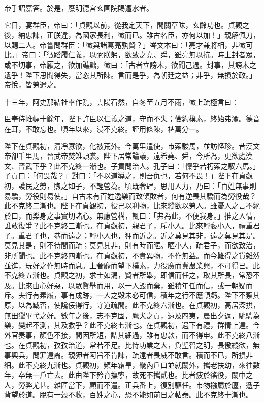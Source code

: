 \begin{pinyinscope}
 帝手詔嘉答。於是，廢明德宮玄圃院賜遭水者。



 它日，宴群臣，帝曰：「貞觀以前，從我定天下，間關草昧，玄齡功也。貞觀之後，納忠諫，正朕違，為國家長利，徵而已。雖古名臣，亦何以加！」親解佩刀，以賜二人。帝嘗問群臣：「徵與諸葛亮孰賢？」岑文本曰：「亮才兼將相，非徵可比。」帝曰：「徵蹈履仁義，以弼朕躬，欲致之堯、舜，雖亮無以抗。時上封者眾，或不切事，帝厭之，欲加譙黜，徵曰：「古者立謗木，欲聞己過。封事，其謗木之遺乎！陛下思聞得失，當恣其所陳。言而是乎，為朝廷之益；非乎，無損於政。」帝悅，皆勞遣之。



 十三年，阿史那結社率作亂，雲陽石然，自冬至五月不雨，徵上疏極言曰：



 臣奉侍帷幄十餘年，陛下許臣以仁義之道，守而不失；儉約樸素，終始弗渝。德音在耳，不敢忘也。頃年以來，浸不克終。謹用條陳，裨萬分一。



 陛下在貞觀初，清凈寡欲，化被荒外。今萬里遣使，市索駿馬，並訪怪珍。昔漢文帝卻千里馬，晉武帝焚雉頭裘。陛下居常論議，遠希堯、舜，今所為，更欲處漢文、晉武下乎？此不克終一漸也。子貢問治人。孔子曰：「懍乎若朽索之馭六馬。」子貢曰：「何畏哉？」對曰：「不以道導之，則吾仇也，若何不畏！」陛下在貞觀初，護民之勞，煦之如子，不輕營為。頃既奢肆，思用人力，乃曰：「百姓無事則易驕，勞役則易使。」自古未有百姓逸樂而致傾敗者，何有逆畏其驕而為勞役哉？此不克終二漸也。陛下在貞觀初，役己以利物，比來縱欲以勞人。雖憂人之言不絕於口，而樂身之事實切諸心。無慮營構，輒曰：「弗為此，不便我身。」推之人情，誰敢復爭？此不克終三漸也。在貞觀初，親君子，斥小人。比來輕褻小人，禮重君子。重君子也，恭而遠之；輕小人也，狎而近之。近之莫見其非，遠之莫見其是。莫見其是，則不待間而疏；莫見其非，則有時而暱。暱小人，疏君子，而欲致治，非所聞也。此不克終四漸也。在貞觀初，不貴異物，不作無益。而今難得之貨雜然並進，玩好之作無時而息。上奢靡而望下樸素，力役廣而冀農業興，不可得已。此不克終五漸也。貞觀之初，求士如渴，賢者所舉，即信而任之，取其所長，常恐不及。比來由心好惡，以眾賢舉而用，以一人毀而棄，雖積年任而信，或一朝疑而斥。夫行有素履，事有成跡，一人之毀未必可信，積年之行不應頓虧。陛下不察其原，以為臧否，使讒佞得行，守道疏間。此不克終六漸也。在貞觀初，高居深拱，無田獵畢弋之好。數年之後，志不克固，鷹犬之貢，遠及四夷，晨出夕返，馳騁為樂，變起不測，其及救乎？此不克終七漸也。在貞觀初，遇下有禮，群情上達。今外官奏事，顏色不接，間因所短，詰其細過，雖有忠款，而不得申。此不克終八漸也。在貞觀初，孜孜治道，常若不足。比恃功業之大，負聖智之明，長慠縱欲，無事興兵，問罪遠裔。親狎者阿旨不肯諫，疏遠者畏威不敢言。積而不已，所損非細。此不克終九漸也。貞觀初，頻年霜旱，畿內戶口並就關外，攜老扶幼，來往數年，卒無一戶亡去。此由陛下矜育撫寧，故死不攜貳也。比者疲於徭役，關中之人，勞弊尤甚。雜匠當下，顧而不遣。正兵番上，復別驅任。市物襁屬於廛，遞子背望於道。脫有一穀不收，百姓之心，恐不能如前日之帖泰。此不克終十漸也。




\end{pinyinscope}
